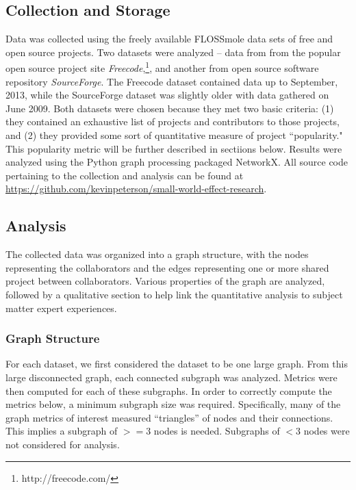\documentclass{proc}
\begin{document}
\subsection{Collection and Storage}
Data was collected using the freely available FLOSSmole\cite{floss2006} data sets of free and open source projects. Two datasets were analyzed -- data from from the popular open source project site \textit{Freecode},\footnote{http://freecode.com/}, and another from open source software repository \textit{SourceForge}. The Freecode dataset contained data up to September, 2013, while the SourceForge dataset was slightly older with data gathered on June 2009. Both datasets were chosen because they met two basic criteria: (1) they contained an exhaustive list of projects and contributors to those projects, and (2) they provided some sort of quantitative measure of project ``popularity." This popularity metric will be further described in sectiions below. Results were analyzed using the Python graph processing packaged NetworkX\cite{hagberg-2008-exploring}. All source code pertaining to the collection and analysis can be found at \url{https://github.com/kevinpeterson/small-world-effect-research}.

\subsection{Analysis}
The collected data was organized into a graph structure, with the nodes representing the collaborators and the edges representing one or more shared project between collaborators. Various properties of the graph are analyzed, followed by a qualitative section to help link the quantitative analysis to subject matter expert experiences.

\subsubsection{Graph Structure}
For each dataset, we first considered the dataset to be one large graph. From this large disconnected graph, each connected subgraph was analyzed. Metrics were then computed for each of these subgraphs. In order to correctly compute the metrics below, a minimum subgraph size was required. Specifically, many of the graph metrics of interest measured ``triangles'' of nodes and their connections. This implies a subgraph of {$>= 3$} nodes is needed. Subgraphs of {$< 3$} nodes were not considered for analysis.
\end{document}
